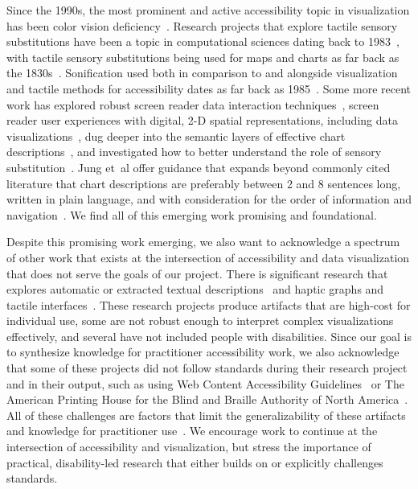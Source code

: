 \documentclass[12pt]{cmuthesis}
\newcommand{\ea}{{et~al\xperiod}\xspace}
\begin{document}
Since the 1990s, the most prominent and active accessibility topic in visualization has been color vision deficiency~\cite{Chaparro2017Applications,Nunez2018Optimizing,Oliveira2013Towards,Lee2020Reaching,Martinez2021Methodology}. Research projects that explore tactile sensory substitutions have been a topic in computational sciences dating back to 1983~\cite{Schiff1983}, with tactile sensory substitutions being used for maps and charts as far back as the 1830s~\cite{HaleExtensive}. Sonification used both in comparison to and alongside visualization and tactile methods for accessibility dates as far back as 1985~\cite{Mansur1985Sound,Flowers1997Cross,Brewster2002Visualization,McGookin2006SoundBar,Zhao2008Data,Cullen2019Co}. Some more recent work has explored robust screen reader data interaction techniques~\cite{Godfrey2018Accessible,Sorge2016Polyfilling}, screen reader user experiences with digital, 2-D spatial representations, including data visualizations~\cite{Schaadhardt2021Understanding,Sharif2021}, dug deeper into the semantic layers of effective chart descriptions~\cite{Lundgard2022Accessible}, and investigated how to better understand the role of sensory substitution~\cite{Chundury2022Towards}. Jung \ea offer guidance that expands beyond commonly cited literature that chart descriptions are preferably between 2 and 8 sentences long, written in plain language, and with consideration for the order of information and navigation~\cite{Jung2022Communicating}. We find all of this emerging work promising and foundational.

Despite this promising work emerging, we also want to acknowledge a spectrum of other work that exists at the intersection of accessibility and data visualization that does not serve the goals of our project. There is significant research that explores automatic or extracted textual descriptions~\cite{Choi2019Visualizing,Balaji2018Chart,Chen2019Neural,Chen2020Figure,Lai2020Automatic,Obeid2020Chart,Qian2021Generating,Sharif2018evoGraphs} and haptic graphs and tactile interfaces~\cite{Aldrich2008Talk,Bornschein2015Collaborative, Brown2012VizTouch,Butler2021Technology,Gallace2011To,Schiff1983,Jansen2015Opportunities,Jayant2007Automated,Lederman1986Perception,SchneiderConstructing,Shi2016Tickers,Baker2016Tactile}. These research projects produce artifacts that are high-cost for individual use, some are not robust enough to interpret complex visualizations effectively, and several have not included people with disabilities. Since our goal is to synthesize knowledge for practitioner accessibility work, we also acknowledge that some of these projects did not follow standards during their research project and in their output, such as using Web Content Accessibility Guidelines~\cite{WCAG} or The American Printing House for the Blind and Braille Authority of North America~\cite{BANA2010Guidelines}. All of these challenges are factors that limit the generalizability of these artifacts and knowledge for practitioner use~\cite{Lundgard2019Sociotechnical,Moraes2014Evaluating,Sharif2021}. We encourage work to continue at the intersection of accessibility and visualization, but stress the importance of practical, disability-led research that either builds on or explicitly challenges standards.
\end{document}
